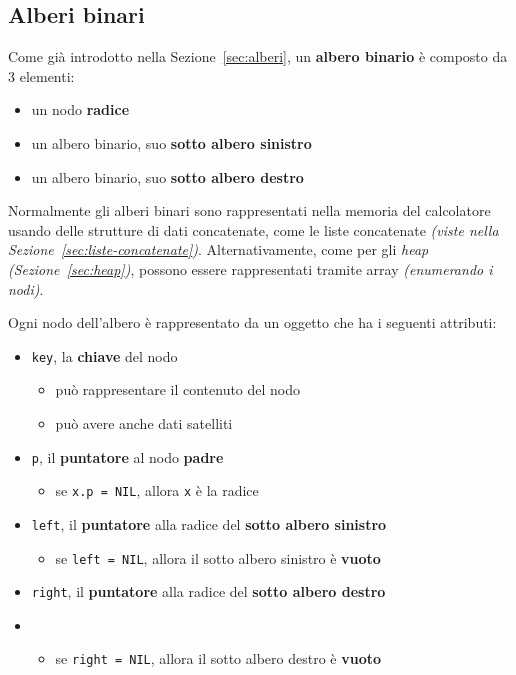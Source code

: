 \documentclass[italian, 10pt]{article}
\begin{document}
\subsection{Alberi binari}

Come già introdotto nella Sezione~\ref{sec:alberi}, un \textbf{albero binario} è composto da \(3\) elementi:

\begin{itemize}
  \item un nodo \textbf{radice}
  \item un albero binario, suo \textbf{sotto albero sinistro}
  \item un albero binario, suo \textbf{sotto albero destro}
\end{itemize}

Normalmente gli alberi binari sono rappresentati nella memoria del calcolatore usando delle strutture di dati concatenate, come le liste concatenate \textit{(viste nella Sezione~\ref{sec:liste-concatenate})}.
Alternativamente, come per gli \textit{heap} \textit{(Sezione~\ref{sec:heap})}, possono essere rappresentati tramite array \textit{(enumerando i nodi)}.

Ogni nodo dell'albero è rappresentato da un oggetto che ha i seguenti attributi:

\begin{itemize}
  \item \texttt{key}, la \textbf{chiave} del nodo
        \begin{itemize}
          \item può rappresentare il contenuto del nodo
          \item può avere anche dati satelliti
        \end{itemize}
  \item \texttt{p}, il \textbf{puntatore} al nodo \textbf{padre}
        \begin{itemize}
          \item se \texttt{x.p = NIL}, allora \texttt{x} è la radice
        \end{itemize}
  \item \texttt{left}, il \textbf{puntatore} alla radice del \textbf{sotto albero sinistro}
        \begin{itemize}[label=\(\rightarrow\)]
          \item se \texttt{left = NIL}, allora il sotto albero sinistro è \textbf{vuoto}
        \end{itemize}
  \item \texttt{right}, il \textbf{puntatore} alla radice del \textbf{sotto albero destro}
  \item   \begin{itemize}[label=\(\rightarrow\)]
          \item se \texttt{right = NIL}, allora il sotto albero destro è \textbf{vuoto}
        \end{itemize}
\end{itemize}
\end{document}
